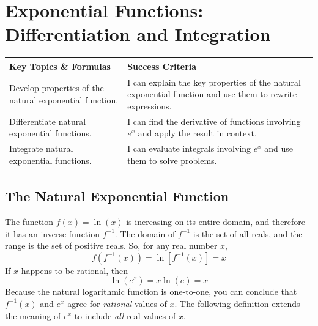 \documentclass[12pt, letterpaper]{article}
\begin{document}
\section{Exponential Functions: Differentiation and Integration}
\begin{objectives}
    \renewcommand{\arraystretch}{1.5} %
    \begin{tabularx}{\textwidth}{@{} >{\raggedright\arraybackslash}X >{\raggedright\arraybackslash}X @{}}
        
        \textbf{Key Topics \& Formulas} & \textbf{Success Criteria} \\ 
        \midrule[1.5pt] %
        
        Develop properties of the natural exponential function.
        & I can explain the key properties of the natural exponential function and use them to rewrite expressions. \\
        \midrule %
        
        Differentiate natural exponential functions.
        & I can find the derivative of functions involving $e^x$ and apply the result in context. \\
        \midrule

        Integrate natural exponential functions.
        & I can evaluate integrals involving $e^x$ and use them to solve problems.
    \end{tabularx}
\end{objectives}

\subsection{The Natural Exponential Function}

The function $f(x)=\ln(x)$ is increasing on its entire domain, and therefore it has an inverse function $f^{-1}$. The domain of $f^{-1}$ is the set of all reals, and the range is the set of positive reals. So, for any real number $x$,
$$f(f^{-1}(x)) = \ln[f^{-1}(x)] = x$$
If $x$ happens to be rational, then
$$\ln(e^x) = x \ln(e) = x$$
Because the natural logarithmic function is one-to-one, you can conclude that $f^{-1}(x)$ and $e^x$ agree for \textit{rational} values of $x$. The following definition extends the meaning of $e^x$ to include \textit{all} real values of $x$.
\end{document}
